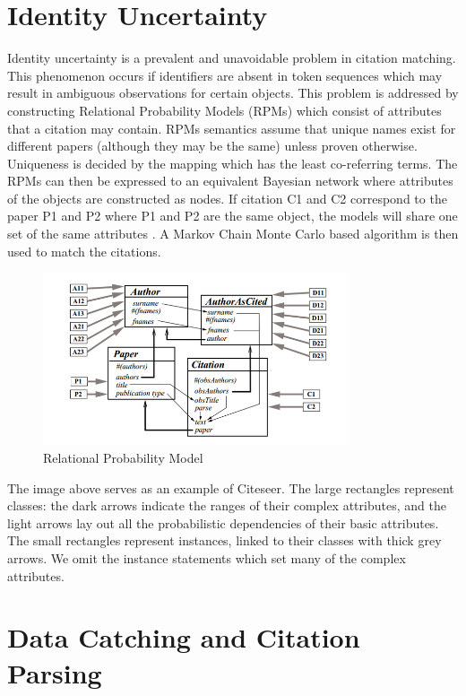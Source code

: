 \section{Identity Uncertainty}
Identity uncertainty is a prevalent and unavoidable problem in citation matching. This phenomenon occurs if identifiers are absent in token sequences which may result in ambiguous observations for certain objects. This problem is addressed by constructing Relational Probability Models (RPMs) which consist of attributes that a citation may contain. RPMs semantics assume that unique names exist for different papers (although they may be the same) unless proven otherwise. Uniqueness is decided by the mapping which has the least co-referring terms. The RPMs can then be expressed to an equivalent Bayesian network where attributes of the objects are constructed as nodes. If citation C1 and C2 correspond to the paper P1 and P2 where P1 and P2 are the same object, the models will share one set of the same attributes \cite{identity_uncert}. A Markov Chain Monte Carlo based algorithm is then used to match the citations. \cite{markov}

\begin{figure}[H]
    \centering
    \includegraphics[width=0.8\textwidth]{RPM.png}
    \caption{Relational Probability Model}
    \label{fig:RPM}
\end{figure}

The image above serves as an example of  Citeseer. The large rectangles represent classes: the dark arrows indicate the ranges of their complex attributes, and the light arrows lay out all the probabilistic dependencies of their basic attributes. The small rectangles represent instances, linked to their classes with thick grey arrows. We omit the instance statements which set many of the complex attributes.

\section{Data Catching and Citation Parsing}

